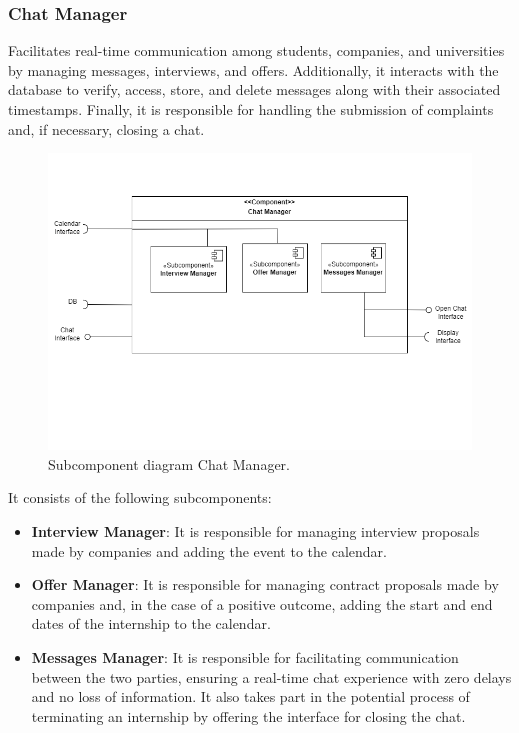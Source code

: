 \clearpage %
\subsubsection{Chat Manager} Facilitates real-time communication among students, companies, and universities by managing messages, interviews, and offers. Additionally, it interacts with the database to verify, access, store, and delete messages along with their associated timestamps. Finally, it is responsible for handling the submission of complaints and, if necessary, closing a chat.
\begin{figure}[H]
    \centering
    \includegraphics[width=0.8\linewidth]{DD/Images/Comp&Sub/ChatManager.png}
    \caption{Subcomponent diagram Chat Manager.}
    \label{fig:chat_manager}
    \end{figure}
    
It consists of the following subcomponents:
\begin{itemize}
    \item  \textbf{Interview Manager}: It is responsible for managing interview proposals made by companies and adding the event to the calendar.
    \item  \textbf{Offer Manager}: It is responsible for managing contract proposals made by companies and, in the case of a positive outcome, adding the start and end dates of the internship to the calendar.
    \item  \textbf{Messages Manager}: It is responsible for facilitating communication between the two parties, ensuring a real-time chat experience with zero delays and no loss of information.
    It also takes part in the potential process of terminating an internship by offering the interface for closing the chat.
    \end{itemize}

